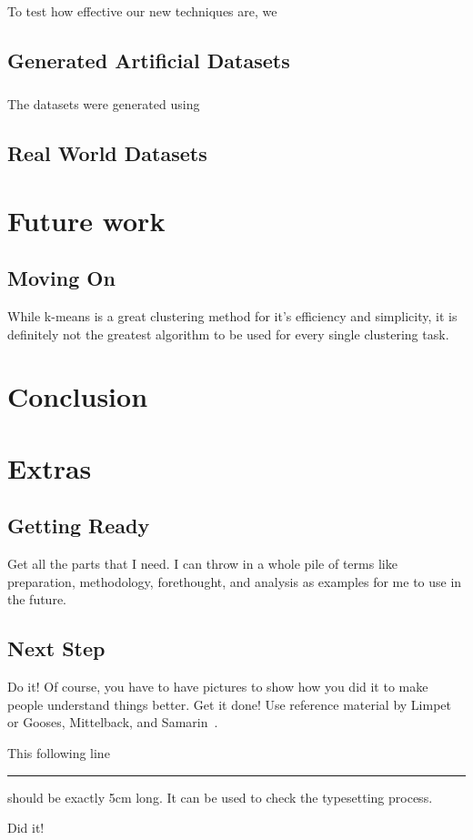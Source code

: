 \documentclass[12pt]{dalthesis}
\begin{document}
\paragraph{}
To test how effective our new techniques are, we 
\section{Generated Artificial Datasets}
\paragraph{}
The datasets were generated using 
\section{Real World Datasets}
\chapter{Future work}
\section{Moving On}
While k-means is a great clustering method for it's efficiency and simplicity, it is definitely not the greatest algorithm to be used for every single clustering task. 

\chapter{Conclusion}


\chapter{Extras}

\section{Getting Ready}

Get all the parts that I need.  I can throw in a whole pile of terms like
preparation,
methodology,
forethought,
and
analysis
as examples for me to use in the future.

\section{Next Step}

Do it!
\cite{latex-by-lamport}
Of course, you have to have pictures to show how you did it to make people
understand things better.
Get it done!  Use reference material by Limpet~\cite{latex-by-lamport} or
Gooses, Mittelback, and Samarin~\cite{latex-companion}.

This following line \rule{5cm}{3pt} should be exactly 5cm long.  It
can be used to check the typesetting process.

Did it!\cite{latex-companion2}



\end{document}

